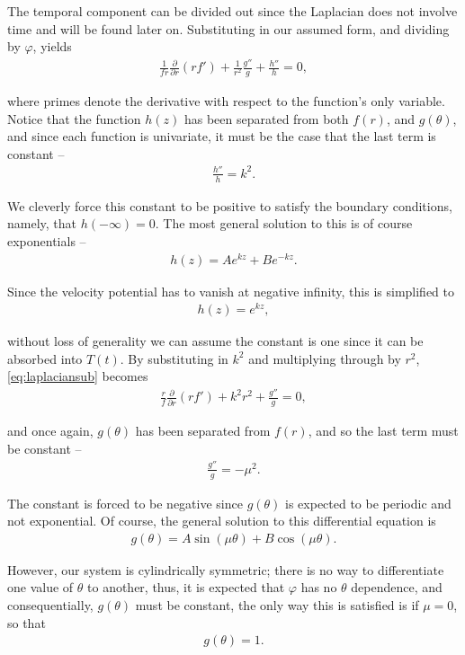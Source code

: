 The temporal component can be divided out since the Laplacian does not involve time and will be found later on. Substituting in our assumed form, and dividing by $\varphi$, yields
\begin{align}
\label{eq:laplaciansub}
\frac{1}{fr}\frac{\partial}{\partial r}(rf') + \frac{1}{r^2}\frac{g''}{g} + \frac{h''}{h} = 0,
\end{align}

where primes denote the derivative with respect to the function's only variable. Notice that the function $h(z)$ has been separated from both $f(r)$, and $g(\theta)$, and since each function is univariate, it must be the case that the last term is constant --
\begin{align*}
\frac{h''}{h} = k^2.
\end{align*}

We cleverly force this constant to be positive to satisfy the boundary conditions, namely, that $h(-\infty) = 0$. The most general solution to this is of course exponentials --
\begin{align*}
h(z) = Ae^{kz} + Be^{-kz}.
\end{align*}

Since the velocity potential has to vanish at negative infinity, this is simplified to
\begin{align}
\label{eq:h}
h(z) = e^{kz},
\end{align}

without loss of generality we can assume the constant is one since it can be absorbed into $T(t)$. By substituting in $k^2$ and multiplying through by $r^2$, \eqref{eq:laplaciansub} becomes
\begin{align}
\label{eq:laplacenoh}
\frac{r}{f}\frac{\partial}{\partial r} \left( rf' \right) + k^2r^2 + \frac{g''}{g} = 0,
\end{align}

and once again, $g(\theta)$ has been separated from $f(r)$, and so the last term must be constant --
\begin{align*}
\frac{g''}{g} = -\mu^2.
\end{align*}

The constant is forced to be negative since $g(\theta)$ is expected to be periodic and not exponential. Of course, the general solution to this differential equation is 
\begin{align*}
g(\theta) = A \sin(\mu \theta) + B \cos(\mu \theta).
\end{align*}

However, our system is cylindrically symmetric; there is no way to differentiate one value of $\theta$ to another, thus, it is expected that $\varphi$ has no $\theta$ dependence, and consequentially, $g(\theta)$ must be constant, the only way this is satisfied is if $\mu = 0$, so that
\begin{align}
\label{eq:g}
g(\theta) = 1.
\end{align}

